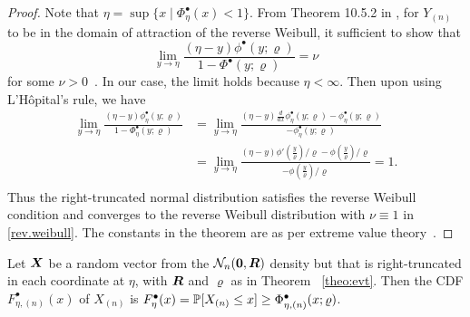 \begin{proof}
Note that $\eta = \sup\{x\mid \Phi_\eta^\bullet(x) < 
1\}$.
From Theorem 10.5.2 in \citet{davidandnagaraja03}, for $Y_{(n)}$ to be
in the domain of attraction of the reverse Weibull, it sufficient to
show that 
\begin{equation*}
\lim_{y \rightarrow \eta}
\frac{(\eta-y)\phi^\bullet(y;\varrho)}{1-\Phi^\bullet(y;\varrho)} = \nu
\end{equation*}
for some $\nu>0$~\citep{vonMises36}. In our case, the limit holds
because  $\eta <\infty$. Then upon using  L'H\^opital's 
rule, we have 
\begin{equation*}
\begin{split}
  \lim_{y \rightarrow \eta}
  \frac{(\eta-y)\phi_\eta^\bullet(y;\varrho)}{1-\Phi_\eta^\bullet(y;\varrho)}  & =
  \lim_{y \rightarrow \eta} \frac{(\eta-y)\frac{d}{dx}\phi_\eta^{\bullet}(y;\varrho)-\phi_\eta^\bullet(y;\varrho)}{-\phi_\eta^\bullet(y;\varrho)}  \\
& = \lim_{y\rightarrow \eta} \frac{(\eta-y)\phi'(\frac
  y\varrho)/\varrho-\phi(\frac y\varrho)/\varrho}{-\phi(\frac y\varrho)/\varrho }=1.\\
\end{split}
\end{equation*}
Thus the right-truncated normal distribution satisfies the reverse Weibull condition and
converges to the reverse Weibull distribution with %
$\nu\! \equiv\! 1$ in \eqref{rev.weibull}. The constants in the
theorem are as per extreme value
theory~\citep{davidandnagaraja03,resnick13}. %
\end{proof}
\begin{theorem}
  \label{theo:trunc.corr.normal}
  Let $\boldsymbol{X}$ %
  be a random vector from the
  $\mathcal N_n(\boldsymbol{0}, \boldsymbol{R})$ density but that is right-truncated in each coordinate
  at $\eta$, with ${\boldsymbol{R}}$ and $\varrho$ as in Theorem ~\ref{theo:evt}. %
Then  the CDF $F^\bullet_{\eta,(n)}(x)$ of $X_{(n)}$ is $F^\bullet_\eta(x) = \mP[X_{(n)} \leq
x] \geq  %
\Phi_{\eta,(n)}^\bullet(x;\varrho)$.
\end{theorem}
